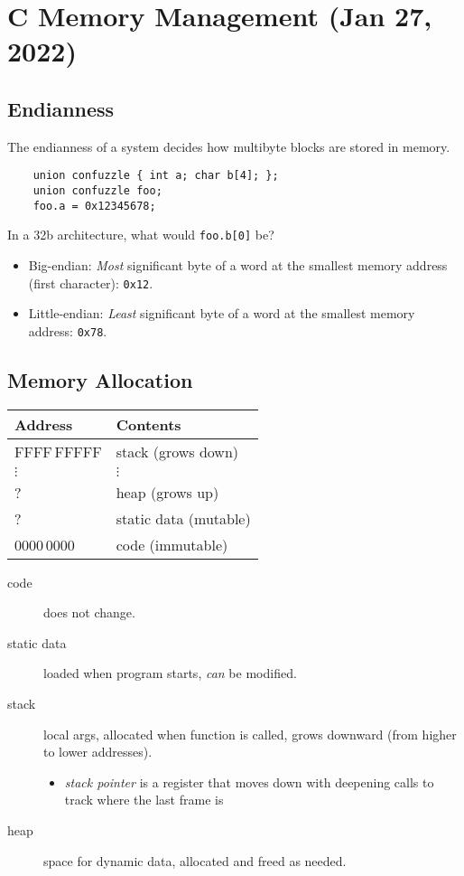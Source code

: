 \chapter{C Memory Management (Jan 27, 2022)}

\section{Endianness}
The endianness of a system decides how multibyte blocks are stored in memory.
\begin{verbatim}
    union confuzzle { int a; char b[4]; };
    union confuzzle foo;
    foo.a = 0x12345678;
\end{verbatim}
In a 32b architecture, what would \texttt{foo.b[0]} be?
\begin{itemize}
    \item Big-endian: \emph{Most} significant byte of a word at the smallest memory address (first character): \texttt{0x12}.
     
    \item Little-endian: \emph{Least} significant byte of a word at the smallest memory address: \texttt{0x78}.
\end{itemize}

\section{Memory Allocation}
\begin{tabular}{ll}
	Address & Contents\\\hline
	FFFF\,FFFFF & stack (grows down)\\
	\(\vdots\) & \(\vdots\) \\
	? & heap (grows up) \\
	? & static data (mutable) \\
	0000\,0000 & code (immutable)
\end{tabular}
\begin{description}
	\item[code] does not change.
	\item[static data] loaded when program starts, \emph{can} be modified.
	\item[stack] local args, allocated when function is called, grows downward (from higher to lower addresses).
		\begin{itemize}
			\item \emph{stack pointer} is a register that moves down with deepening calls to track where the last frame is
		\end{itemize}
	\item[heap] space for dynamic data, allocated and freed as needed.
\end{description}

